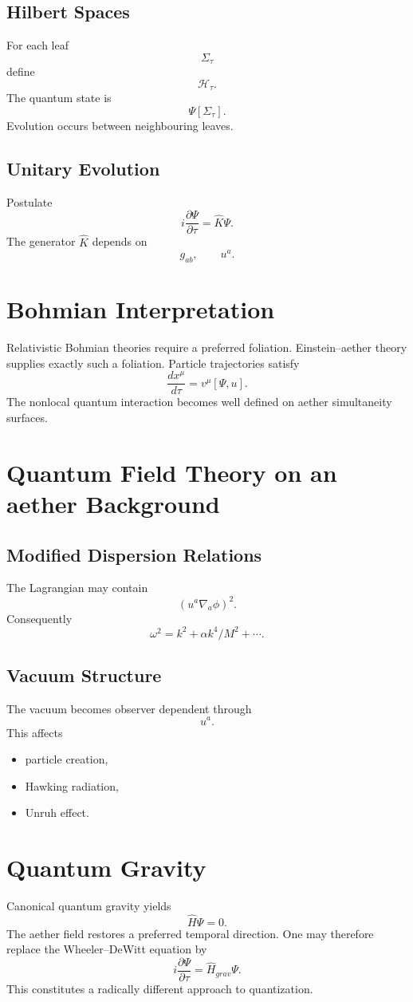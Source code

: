 \documentclass[11pt]{book}
\begin{document}
\section{Hilbert Spaces}
For each leaf
\[\Sigma_\tau\]
define
\[\mathcal H_\tau.\]
The quantum state is
\[\Psi[\Sigma_\tau].\]
Evolution occurs between neighbouring leaves.

\section{Unitary Evolution}
Postulate
\[i\frac{\partial \Psi}{\partial\tau}=\hat K \Psi .\]
The generator $\hat K$ depends on
\[g_{ab},\qquad u^a .\]

\chapter{Bohmian Interpretation}
Relativistic Bohmian theories require a preferred foliation.
Einstein--aether theory supplies exactly such a foliation.
Particle trajectories satisfy
\[\frac{dx^\mu}{d\tau}=v^\mu[\Psi,u].\]
The nonlocal quantum interaction becomes well defined on
aether simultaneity surfaces.

\chapter{Quantum Field Theory on an aether Background}
\section{Modified Dispersion Relations}
The Lagrangian may contain
\[(u^a\nabla_a\phi)^2.\]
Consequently
\[\omega^2=k^2+\alpha k^4/M^2+\cdots.\]

\section{Vacuum Structure}
The vacuum becomes observer dependent through
\[u^a.\]
This affects
\begin{itemize}
\item particle creation,
\item Hawking radiation,
\item Unruh effect.
\end{itemize}

\chapter{Quantum Gravity}
Canonical quantum gravity yields
\[\hat H\Psi=0.\]
The aether field restores a preferred temporal direction.
One may therefore replace the Wheeler--DeWitt equation by
\[i\frac{\partial \Psi}{\partial\tau}=\hat H_{grav}\Psi .\]
This constitutes a radically different approach to
quantization.
\end{document}
